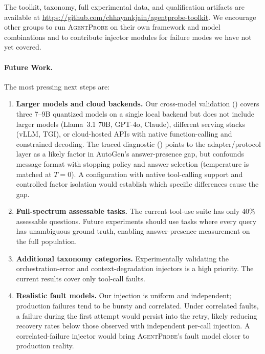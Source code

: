\documentclass[make,article,submit,moreauthors,pdftex]{mdpi}
\providecommand{\agentprobe}{\textsc{AgentProbe}}
\begin{document}
The toolkit, taxonomy, full experimental data, and qualification artifacts are available at \url{https://github.com/chhayankjain/agentprobe-toolkit}. We encourage other groups to run \agentprobe{} on their own framework and model combinations and to contribute injector modules for failure modes we have not yet covered.

\paragraph{Future Work.}
The most pressing next steps are:

\begin{enumerate}
  \item {\color{green!50!black}\textbf{Larger models and cloud backends.} Our cross-model validation () covers three 7--9B quantized models on a single local backend but does not include larger models (Llama~3.1 70B, GPT-4o, Claude), different serving stacks (vLLM, TGI), or cloud-hosted APIs with native function-calling and constrained decoding. The traced diagnostic () points to the adapter/protocol layer as a likely factor in AutoGen's answer-presence gap, but confounds message format with stopping policy and answer selection (temperature is matched at $T\!=\!0$). A configuration with native tool-calling support and controlled factor isolation would establish which specific differences cause the gap.}

  \item {\color{orange!80!black}\textbf{Full-spectrum assessable tasks.} The current tool-use suite has only 40\% assessable questions. Future experiments should use tasks where every query has unambiguous ground truth, enabling answer-presence measurement on the full population.}

  \item {\color{orange!80!black}\textbf{Additional taxonomy categories.} Experimentally validating the orchestration-error and context-degradation injectors is a high priority. The current results cover only tool-call faults.}

  \item {\color{blue}\textbf{Realistic fault models.} Our injection is uniform and independent; production failures tend to be bursty and correlated. Under correlated faults, a failure during the first attempt would persist into the retry, likely reducing recovery rates below those observed with independent per-call injection. A correlated-failure injector would bring \agentprobe{}'s fault model closer to production reality.}


\end{enumerate}
\end{document}
